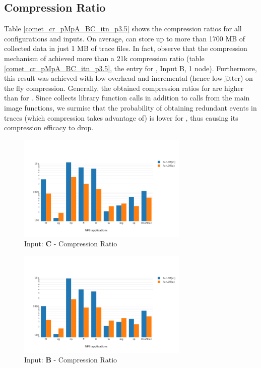   
\subsection{Compression Ratio}
\label{subsec:cr}

Table \ref{comet_cr_pMpA_BC_itn_p3.5} shows the compression ratios for all configurations and inputs. 
On average, \parlot can store up to more than 1700 MB of collected data in just 1 MB of trace files. 
In fact, observe that the compression mechanism of
\parlot achieved more than a 21k compression ratio (table \ref{comet_cr_pMpA_BC_itn_p3.5}, 
the entry for \parlotm, Input B, 1 node).
%
Furthermore, this result was achieved with low overhead and incremental (hence low-jitter) 
on the fly compression.
%
Generally, the obtained
compression ratios for \parlotm are higher than for \parlota. 
%
Since \parlota  collects library function calls in addition to calls from
the main image functions, 
we surmise that the probability of obtaining
redundant events in traces (which compression takes advantage of)
is lower for \parlota, thus causing its compression efficacy to drop.
  



\begin{figure}[!t]
\centering
\includegraphics[width=3.2in]{figs.comet.newMed/comet_chartAvg_cr_C_p3_5.png}
\caption{ Input: \textbf{C}  - Compression Ratio
}
\label{comet_chartAvg_cr_C_p3_5}
\end{figure}


\begin{figure}[!t]
\centering
\includegraphics[width=3.2in]{figs.comet.newMed/comet_chartAvg_cr_B_p3_5.png}
\caption{ Input: \textbf{B}  - Compression Ratio
}
\label{comet_chartAvg_cr_B_p3_5}
\end{figure}
  

